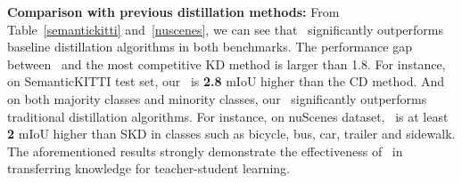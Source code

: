 \noindent \textbf{Comparison with previous distillation methods:} From Table~\ref{semantickitti} and~\ref{nuscenes}, we can see that \algorithmname~significantly outperforms baseline distillation algorithms in both benchmarks. The performance gap between \algorithmname~and the most competitive KD method is larger than 1.8. For instance, on SemanticKITTI test set, our \algorithmname~is \textbf{2.8} mIoU higher than the CD method. And on both majority classes and minority classes, our \algorithmname~significantly outperforms traditional distillation algorithms. For instance, on nuScenes dataset, \algorithmname~is at least \textbf{2} mIoU higher than SKD in classes such as bicycle, bus, car, trailer and sidewalk. The aforementioned results strongly demonstrate the effectiveness of \algorithmname~in transferring knowledge for teacher-student learning.


